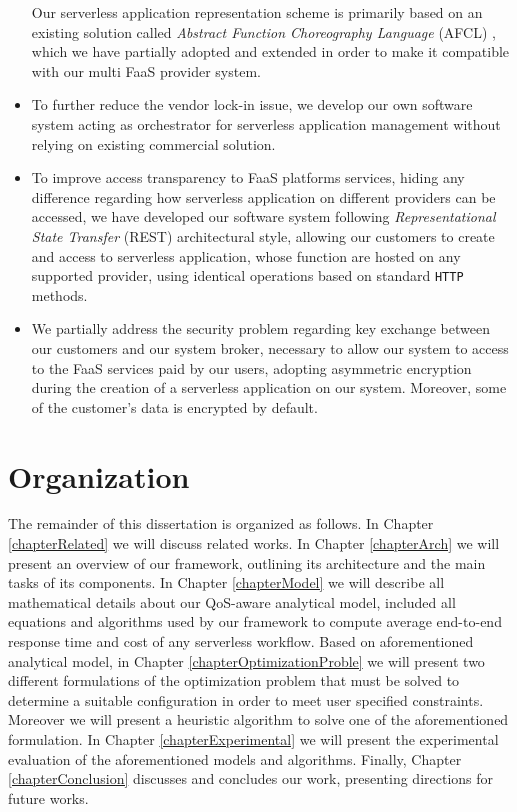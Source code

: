 \documentclass[12pt,a4paper]{report}
\begin{document}
\begin{itemize}
	Our serverless application representation scheme is primarily based on an existing solution called \textit{Abstract Function Choreography Language} (AFCL) \cite{AFCL}, which we have partially adopted and extended in order to make it compatible with our multi FaaS provider system. 
	
	\item To further reduce the vendor lock-in issue, we develop our own software system acting as orchestrator for serverless application management without relying on existing commercial solution.
	
	\item To improve access transparency to FaaS platforms services, hiding any difference regarding how serverless application on different providers can be accessed, we have developed our software system following \textit{Representational State Transfer} (REST) architectural style, allowing our customers to create and access to serverless application, whose function are hosted on any supported provider, using identical operations based on standard \texttt{HTTP} methods.
	
	\item We partially address the security problem regarding key exchange between our customers and our system broker, necessary to allow our system to access to the FaaS services paid by our users, adopting asymmetric encryption during the creation of a serverless application on our system. Moreover, some of the customer's data is encrypted by default.
	
\end{itemize}

\section{Organization}

The remainder of this dissertation is organized as follows. In Chapter \ref{chapterRelated} we will discuss related works. In Chapter \ref{chapterArch} we will present an overview of our framework, outlining its architecture and the main tasks of its components. In Chapter \ref{chapterModel} we will describe all mathematical details about our QoS-aware analytical model, included all equations and algorithms used by our framework to compute average end-to-end response time and cost of any serverless workflow. Based on aforementioned analytical model, in Chapter \ref{chapterOptimizationProble} we will present two different formulations of the optimization problem that must be solved to determine a suitable configuration in order to meet user specified constraints. Moreover we will present a heuristic algorithm to solve one of the aforementioned formulation. In Chapter \ref{chapterExperimental} we will present the experimental evaluation of the aforementioned models and algorithms.  Finally, Chapter \ref{chapterConclusion} discusses and concludes our work, presenting directions for future works.
\end{document}
